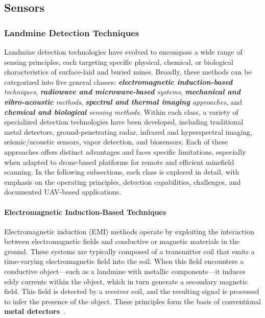 \subsection{Sensors}

\subsubsection{Landmine Detection Techniques}

Landmine detection technologies have evolved to encompass a wide range of sensing principles, each targeting specific physical, chemical, or biological characteristics of surface-laid and buried mines. Broadly, these methods can be categorized into five general classes: \textit{\textbf{electromagnetic induction-based} techniques}, \textit{\textbf{radiowave and microwave-based} systems}, \textit{\textbf{mechanical and vibro-acoustic} methods}, \textit{\textbf{spectral and thermal imaging} approaches}, and \textit{\textbf{chemical and biological} sensing methods}. Within each class, a variety of specialized detection technologies have been developed, including traditional metal detectors, ground-penetrating radar, infrared and hyperspectral imaging, seismic/acoustic sensors, vapor detection, and biosensors. Each of these approaches offers distinct advantages and faces specific limitations, especially when adapted to drone-based platforms for remote and efficient minefield scanning. In the following subsections, each class is explored in detail, with emphasis on the operating principles, detection capabilities, challenges, and documented UAV-based applications.

\paragraph{Electromagnetic Induction-Based Techniques}

Electromagnetic induction (EMI) methods operate by exploiting the interaction between electromagnetic fields and conductive or magnetic materials in the ground. These systems are typically composed of a transmitter coil that emits a time-varying electromagnetic field into the soil. When this field encounters a conductive object—such as a landmine with metallic components—it induces eddy currents within the object, which in turn generate a secondary magnetic field. This field is detected by a receiver coil, and the resulting signal is processed to infer the presence of the object. These principles form the basis of conventional \textbf{metal detectors}~\cite{gichd2006guidebook}.

